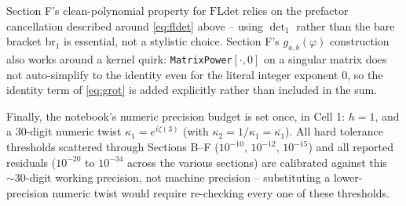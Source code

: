 \documentclass[11pt]{article}
\begin{document}
Section F's clean-polynomial property for $\mathrm{FLdet}$ relies on the prefactor cancellation
described around \eqref{eq:fldet} above -- using $\det_1$ rather than the bare bracket
$\mathrm{br}_1$ is essential, not a stylistic choice. Section F's $g_{a,b}(\varphi)$ construction
also works around a kernel quirk: \texttt{MatrixPower}$[\cdot,0]$ on a singular matrix does not
auto-simplify to the identity even for the literal integer exponent $0$, so the identity term of
\eqref{eq:grot} is added explicitly rather than included in the sum.

Finally, the notebook's numeric precision budget is set once, in Cell 1: $h=1$, and a 30-digit
numeric twist $\kappa_1=e^{i\zeta(3)}$ (with $\kappa_2=1/\kappa_1=\overline{\kappa_1}$). All hard
tolerance thresholds scattered through Sections B--F ($10^{-10}$, $10^{-12}$, $10^{-15}$) and all
reported residuals ($10^{-20}$ to $10^{-34}$ across the various sections) are calibrated against
this $\sim30$-digit working precision, not machine precision -- substituting a lower-precision
numeric twist would require re-checking every one of these thresholds.
\end{document}
